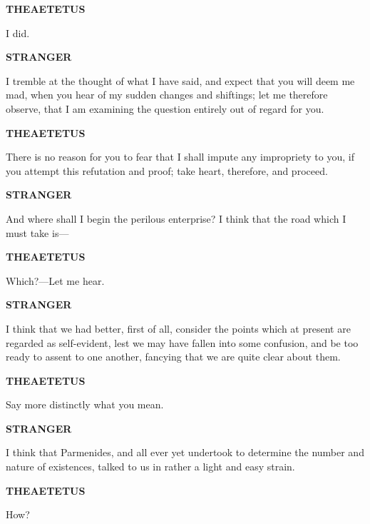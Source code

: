 \documentclass[11pt,letter]{article}
\begin{document}
\par \textbf{THEAETETUS}
\par   I did.

\par \textbf{STRANGER}
\par   I tremble at the thought of what I have said, and expect that you will deem me mad, when you hear of my sudden changes and shiftings; let me therefore observe, that I am examining the question entirely out of regard for you.

\par \textbf{THEAETETUS}
\par   There is no reason for you to fear that I shall impute any impropriety to you, if you attempt this refutation and proof; take heart, therefore, and proceed.

\par \textbf{STRANGER}
\par   And where shall I begin the perilous enterprise? I think that the road which I must take is—

\par \textbf{THEAETETUS}
\par   Which?—Let me hear.

\par \textbf{STRANGER}
\par   I think that we had better, first of all, consider the points which at present are regarded as self-evident, lest we may have fallen into some confusion, and be too ready to assent to one another, fancying that we are quite clear about them.

\par \textbf{THEAETETUS}
\par   Say more distinctly what you mean.

\par \textbf{STRANGER}
\par   I think that Parmenides, and all ever yet undertook to determine the number and nature of existences, talked to us in rather a light and easy strain.

\par \textbf{THEAETETUS}
\par   How?
\end{document}
